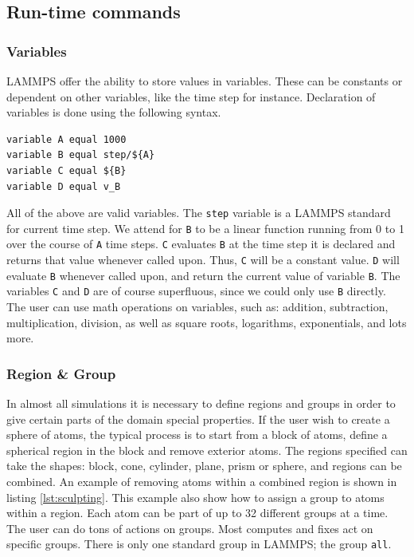 \documentclass[twoside,english]{uiofysmaster}
\begin{document}
\subsection{Run-time commands}  \label{sec:run-timeCommands}
\subsubsection{Variables}
LAMMPS offer the ability to store values in variables. These can be constants or dependent on other variables, like the time step for instance. Declaration of variables is done using the following syntax.
\begin{lstlisting}[language=LammpsInput, caption={Declaration of variables.}, label={lammpsVariable}]
variable A equal 1000
variable B equal step/${A}
variable C equal ${B}
variable D equal v_B
\end{lstlisting} 
All of the above are valid variables. 
The \texttt{step} variable is a LAMMPS standard for current time step.
We attend for \texttt{B} to be a linear function running from 0 to 1 over the course of \texttt{A} time steps. 
\texttt{C} evaluates \texttt{B} at the time step it is declared and returns that value whenever called upon. 
Thus, \texttt{C} will be a constant value.
\texttt{D} will evaluate \texttt{B} whenever called upon, and return the current value of variable \texttt{B}. 
The variables \texttt{C} and \texttt{D} are of course superfluous, since we could only use \texttt{B} directly.
The user can use math operations on variables, such as: addition, subtraction, multiplication, division, as well as square roots, logarithms, exponentials, and lots more.


\subsubsection{Region \& Group}
In almost all simulations it is necessary to define regions and groups in order to give certain parts of the domain special properties. 
If the user wish to create a sphere of atoms, the typical process is to start from a block of atoms, define a spherical region in the block and remove exterior atoms. 
The regions specified can take the shapes: block, cone, cylinder, plane, prism or sphere, and regions can be combined.
An example of removing atoms within a combined region is shown in listing \ref{lst:sculpting}. 
This example also show how to assign a group to atoms within a region. 
Each atom can be part of up to 32 different groups at a time. 
The user can do tons of actions on groups. 
Most computes and fixes act on specific groups. 
There is only one standard group in LAMMPS; the group \texttt{all}.
\end{document}
